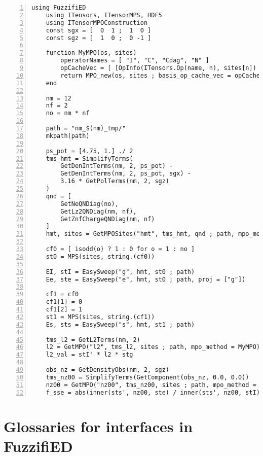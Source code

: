 \documentclass{timesjhep}
\begin{document}
\begin{lstlisting}[numbers=left]
    using FuzzifiED
    using ITensors, ITensorMPS, HDF5
    using ITensorMPOConstruction
    const sgx = [  0  1 ;  1  0 ]
    const sgz = [  1  0 ;  0 -1 ]

    function MyMPO(os, sites)
        operatorNames = [ "I", "C", "Cdag", "N" ]
        opCacheVec = [ [OpInfo(ITensors.Op(name, n), sites[n]) for name in operatorNames] for n in eachindex(sites)  ]
        return MPO_new(os, sites ; basis_op_cache_vec = opCacheVec)
    end

    nm = 12
    nf = 2
    no = nm * nf

    path = "nm_$(nm)_tmp/"
    mkpath(path)

    ps_pot = [4.75, 1.] ./ 2
    tms_hmt = SimplifyTerms(
        GetDenIntTerms(nm, 2, ps_pot) - 
        GetDenIntTerms(nm, 2, ps_pot, sgx) - 
        3.16 * GetPolTerms(nm, 2, sgz)
    )
    qnd = [ 
        GetNeQNDiag(no), 
        GetLz2QNDiag(nm, nf), 
        GetZnfChargeQNDiag(nm, nf) 
    ]
    hmt, sites = GetMPOSites("hmt", tms_hmt, qnd ; path, mpo_method = MyMPO)

    cf0 = [ isodd(o) ? 1 : 0 for o = 1 : no ]
    st0 = MPS(sites, string.(cf0))

    EI, stI = EasySweep("g", hmt, st0 ; path)
    Ee, ste = EasySweep("e", hmt, st0 ; path, proj = ["g"])

    cf1 = cf0
    cf1[1] = 0
    cf1[2] = 1
    st1 = MPS(sites, string.(cf1))
    Es, sts = EasySweep("s", hmt, st1 ; path)

    tms_l2 = GetL2Terms(nm, 2)
    l2 = GetMPO("l2", tms_l2, sites ; path, mpo_method = MyMPO)
    l2_val = stI' * l2 * stg

    obs_nz = GetDensityObs(nm, 2, sgz)
    tms_nz00 = SimplifyTerms(GetComponent(obs_nz, 0.0, 0.0))
    nz00 = GetMPO("nz00", tms_nz00, sites ; path, mpo_method = MyMPO)
    f_sse = abs(inner(sts', nz00, ste) / inner(sts', nz00, stI))
\end{lstlisting}

\section{Glossaries for interfaces in FuzzifiED}
\end{document}
